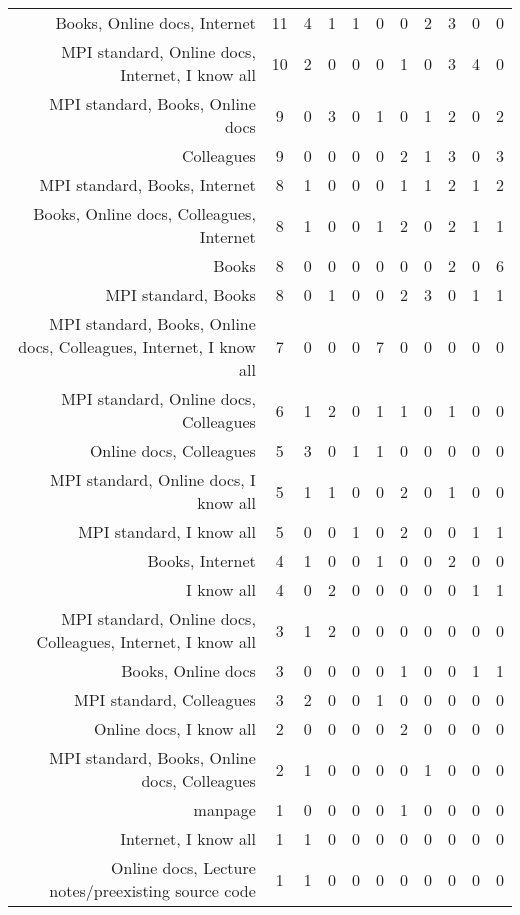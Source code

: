 {\begin{landscape}
\begin{longtable}[htb]{r|c|c|c|c|c|c|c|c|c|c}
{Books, Online docs, Internet} & 11 & 4 & 1 & 1 & 0 & 0 & 2 & 3 & 0 & 0 \\%
{MPI standard, Online docs, Internet, I know all} & 10 & 2 & 0 & 0 & 0 & 1 & 0 & 3 & 4 & 0 \\%
{MPI standard, Books, Online docs} & 9 & 0 & 3 & 0 & 1 & 0 & 1 & 2 & 0 & 2 \\%
{Colleagues} & 9 & 0 & 0 & 0 & 0 & 2 & 1 & 3 & 0 & 3 \\%
{MPI standard, Books, Internet} & 8 & 1 & 0 & 0 & 0 & 1 & 1 & 2 & 1 & 2 \\%
{Books, Online docs, Colleagues, Internet} & 8 & 1 & 0 & 0 & 1 & 2 & 0 & 2 & 1 & 1 \\%
{Books} & 8 & 0 & 0 & 0 & 0 & 0 & 0 & 2 & 0 & 6 \\%
{MPI standard, Books} & 8 & 0 & 1 & 0 & 0 & 2 & 3 & 0 & 1 & 1 \\%
{MPI standard, Books, Online docs, Colleagues, Internet, I know all} & 7 & 0 & 0 & 0 & 7 & 0 & 0 & 0 & 0 & 0 \\%
{MPI standard, Online docs, Colleagues} & 6 & 1 & 2 & 0 & 1 & 1 & 0 & 1 & 0 & 0 \\%
{Online docs, Colleagues} & 5 & 3 & 0 & 1 & 1 & 0 & 0 & 0 & 0 & 0 \\%
{MPI standard, Online docs, I know all} & 5 & 1 & 1 & 0 & 0 & 2 & 0 & 1 & 0 & 0 \\%
{MPI standard, I know all} & 5 & 0 & 0 & 1 & 0 & 2 & 0 & 0 & 1 & 1 \\%
{Books, Internet} & 4 & 1 & 0 & 0 & 1 & 0 & 0 & 2 & 0 & 0 \\%
{I know all} & 4 & 0 & 2 & 0 & 0 & 0 & 0 & 0 & 1 & 1 \\%
{MPI standard, Online docs, Colleagues, Internet, I know all} & 3 & 1 & 2 & 0 & 0 & 0 & 0 & 0 & 0 & 0 \\%
{Books, Online docs} & 3 & 0 & 0 & 0 & 0 & 1 & 0 & 0 & 1 & 1 \\%
{MPI standard, Colleagues} & 3 & 2 & 0 & 0 & 1 & 0 & 0 & 0 & 0 & 0 \\%
{Online docs, I know all} & 2 & 0 & 0 & 0 & 0 & 2 & 0 & 0 & 0 & 0 \\%
{MPI standard, Books, Online docs, Colleagues} & 2 & 1 & 0 & 0 & 0 & 0 & 1 & 0 & 0 & 0 \\%
{manpage} & 1 & 0 & 0 & 0 & 0 & 1 & 0 & 0 & 0 & 0 \\%
{Internet, I know all} & 1 & 1 & 0 & 0 & 0 & 0 & 0 & 0 & 0 & 0 \\%
{Online docs, Lecture notes/preexisting source code} & 1 & 1 & 0 & 0 & 0 & 0 & 0 & 0 & 0 & 0 \\%

\end{longtable}
\end{landscape}}
